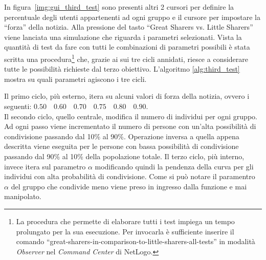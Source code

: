 In figura~\ref{img:gui_third_test} sono presenti altri 2 cursori per definire la percentuale degli utenti appartenenti ad ogni gruppo e 
il cursore per impostare la ``forza'' della notizia.
Alla pressione del tasto ``Great Sharers vs. Little Sharers'' viene lanciata una simulazione che riguarda i parametri selezionati.
Vista la quantità di test da fare con tutti le combinazioni di parametri possibili è stata scritta una procedura\footnote{\scriptsize 
La procedura che permette di elaborare tutti i test impiega un tempo prolungato per la sua esecuzione.
Per invocarla è sufficiente inserire il comando ``great-sharers-in-comparison-to-little-sharers-all-tests'' in modalità \emph{Observer} nel \emph{Command Center} di NetLogo.
} che, grazie ai sui tre cicli annidati, riesce a considerare tutte le possibilità richieste dal terzo obiettivo.
L'algoritmo \ref{alg:third_test} mostra su quali parametri agiscono i tre cicli.

Il primo ciclo, più esterno, itera su alcuni valori di forza della notizia, 
ovvero i seguenti: $0.50 \quad 0.60 \quad 0.70 \quad 0.75 \quad 0.80 \quad 0.90$.\\
Il secondo ciclo, quello centrale, modifica il numero di individui per ogni gruppo. 
Ad ogni passo viene incrementato il numero di persone con un'alta possibilità di condivisione 
passando dal 10\% al 90\%. Operazione inversa a quella appena descritta viene eseguita per le persone con bassa possibilità di 
condivisione passando dal 90\% al 10\% della popolazione totale.
Il terzo ciclo, più interno, invece itera sul parametro $\alpha$ modificando quindi la pendenza della 
curva per gli individui con alta probabilità di condivisione.
Come si può notare il paramentro $\alpha$ del gruppo che condivide meno viene preso in ingresso dalla funzione e
mai manipolato.

